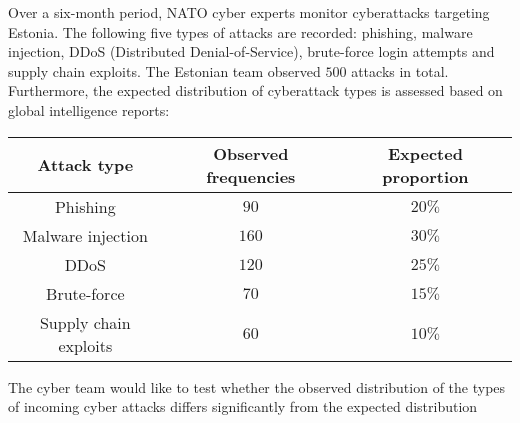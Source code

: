 \begin{enquestion}{20}{
    Over a six-month period, NATO cyber experts monitor cyberattacks targeting Estonia.
    The following five types of attacks are recorded: phishing, malware injection, DDoS (Distributed Denial-of-Service), brute-force login attempts and supply chain exploits.
    The Estonian team observed $500$ attacks in total.
    Furthermore, the expected distribution of cyberattack types is assessed based on global intelligence reports:
    \begin{center}
        \begin{tabular}{ccc}
            \toprule
                {\bfseries Attack type} & {\bfseries Observed frequencies} & {\bfseries Expected proportion}\\
            \midrule 
                Phishing & $90$ & $20\%$ \\
                Malware injection & $160$ & $30\%$ \\
                DDoS & $120$ & $25\%$ \\
                Brute-force & $70$ & $15\%$ \\
                Supply chain exploits & $60$ & $10\%$ \\
            \bottomrule
        \end{tabular}
    \end{center}
    The cyber team would like to test whether the observed distribution of the types of incoming cyber attacks differs significantly from the expected distribution
}



\end{enquestion}
